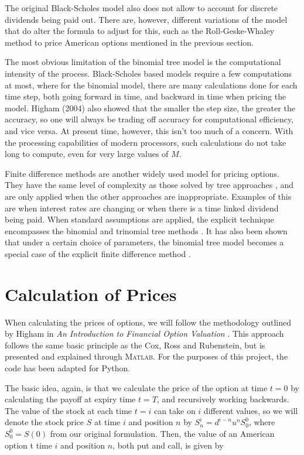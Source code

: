 \documentclass[letterpaper,12pt]{article}
\theoremstyle{plain}
\newcommand{\MATLAB}{\textsc{Matlab}\xspace}
\numberwithin{equation}{section}
\begin{document}
The original Black-Scholes model also does not allow to account for discrete dividends being paid out. There are, however, different variations of the model that do alter the formula to adjust for this, such as the  Roll-Geske-Whaley method to price American options mentioned in the previous section.

The most obvious limitation of the binomial tree model is the computational intensity of the process. Black-Scholes based models require a few computations at most, where for the binomial model, there are many calculations done for each time step, both going forward in time, and backward in time when pricing the model. Higham (2004) also showed that the smaller the step size, the greater the accuracy, so one will always be trading off accuracy for computational efficiency, and vice versa. At present time, however, this isn't too much of a concern. With the processing capabilities of modern processors, such calculations do not take long to compute, even for very large values of $M$.

Finite difference methods are another widely used model for pricing options. They have the same level of complexity as those solved by tree approaches \cite{OFD}, and are only applied when the other approaches are inappropriate. Examples of this are when interest rates are changing or when there is a time linked dividend being paid. When standard assumptions are applied, the explicit technique encompasses the binomial and trinomial tree methods \cite{123}. It has also been shown that under a certain choice of parameters, the binomial tree model becomes a special case of the explicit finite difference method \cite{RUB}.



\section{Calculation of Prices}
When calculating the prices of options, we will follow the methodology outlined by Higham in {\em An Introduction to Financial Option Valuation} \cite{FOV}. This approach follows the same basic principle as the Cox, Ross and Rubenstein, but is presented and explained through \MATLAB. For the purposes of this project, the code has been adapted for Python. 

The basic idea, again, is that we calculate the price of the option at time $t=0$ by calculating the payoff at expiry time $t=T$, and recursively working backwards. The value of the stock at each time $t = i$ can take on $i$ different values, so we will denote the stock price $S$ at time $i$ and position $n$ by \newline $S^i_n= d^{i-n}u^nS^0_0$, where $S^0_0 = S(0)$ from our original formulation. Then, the value of an American option t time $i$ and position $n$, both put and call, is given by
\end{document}
